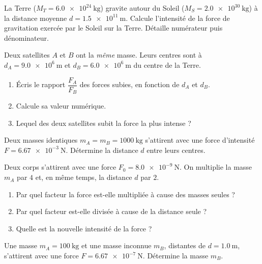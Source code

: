 \documentclass[11pt,a4paper]{article}
\begin{document}

\begin{exo}
La Terre ($M_T=\qty{6.0e24}{\kilogram}$) gravite autour du Soleil
($M_S=\qty{2.0e30}{\kilogram}$) à la distance moyenne $d=\qty{1.5e11}{\metre}$.
Calcule l'intensité de la force de gravitation exercée par le Soleil sur la Terre.
Détaille numérateur puis dénominateur.
\end{exo}

\begin{exo}
Deux satellites $A$ et $B$ ont la \emph{même} masse. Leurs centres sont à
$d_A=\qty{9.0e6}{\metre}$ et $d_B=\qty{6.0e6}{\metre}$ du centre de la Terre.
\begin{enumerate}[label=\alph*)]
  \item Écris le rapport $\dfrac{F_A}{F_B}$ des forces subies, en fonction de $d_A$ et $d_B$.
  \item Calcule sa valeur numérique.
  \item Lequel des deux satellites subit la force la plus intense ?
\end{enumerate}
\end{exo}

\begin{exo}
Deux masses identiques $m_A=m_B=\qty{1000}{\kilogram}$ s'attirent avec une force
d'intensité $F=\qty{6.67e-3}{\newton}$. Détermine la distance $d$ entre leurs centres.
\end{exo}

\begin{exo}
Deux corps s'attirent avec une force $F_0=\qty{8.0e-9}{\newton}$. On multiplie la
masse $m_A$ par $4$ et, en même temps, la distance $d$ par $2$.
\begin{enumerate}[label=\alph*)]
  \item Par quel facteur la force est-elle multipliée à cause des masses seules ?
  \item Par quel facteur est-elle divisée à cause de la distance seule ?
  \item Quelle est la nouvelle intensité de la force ?
\end{enumerate}
\end{exo}

\begin{exo}
Une masse $m_A=\qty{100}{\kilogram}$ et une masse inconnue $m_B$, distantes de
$d=\qty{1.0}{\metre}$, s'attirent avec une force $F=\qty{6.67e-7}{\newton}$.
Détermine la masse $m_B$.
\end{exo}
\end{document}
